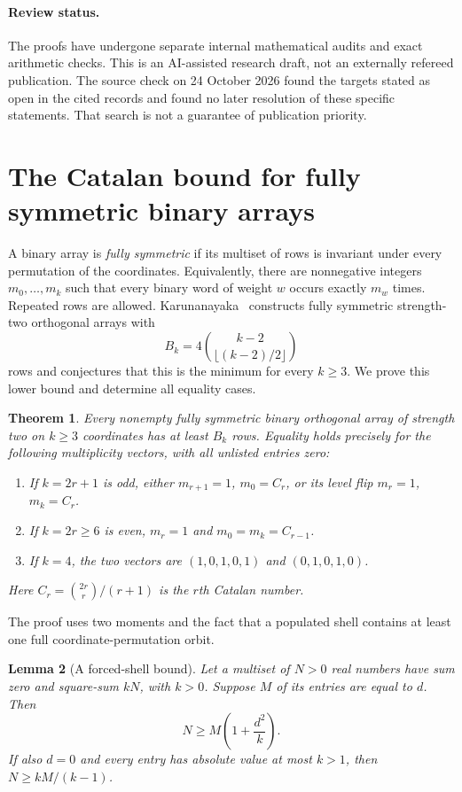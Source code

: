 \documentclass[11pt]{article}
\newtheorem{theorem}{Theorem}[section]
\newtheorem{lemma}[theorem]{Lemma}
\theoremstyle{remark}
\numberwithin{equation}{section}
\begin{document}
\paragraph{Review status.}
The proofs have undergone separate internal mathematical audits and exact
arithmetic checks. This is an AI-assisted research draft, not an externally
refereed publication. The source check on 24 October 2026 found the targets
stated as open in the cited records and found no later resolution of these
specific statements. That search is not a guarantee of publication priority.

\section{The Catalan bound for fully symmetric binary arrays}
\label{sec:catalan-bound}

A binary array is \emph{fully symmetric} if its multiset of rows is invariant
under every permutation of the coordinates.  Equivalently, there are
nonnegative integers $m_0,\ldots,m_k$ such that every binary word of weight
$w$ occurs exactly $m_w$ times.  Repeated rows are allowed.
Karunanayaka~\cite{Karunanayaka2026} constructs fully symmetric strength-two
orthogonal arrays with
\[
 B_k=4\binom{k-2}{\lfloor(k-2)/2\rfloor}
\]
rows and conjectures that this is the minimum for every $k\ge3$.
We prove this lower bound and determine all equality cases.

\begin{theorem}\label{thm:catalan-minimum}
Every nonempty fully symmetric binary orthogonal array of strength two on
$k\ge3$ coordinates has at least $B_k$ rows.  Equality holds precisely for
the following multiplicity vectors, with all unlisted entries zero:
\begin{enumerate}
\item If $k=2r+1$ is odd, either $m_{r+1}=1$, $m_0=C_r$, or its level flip
$m_r=1$, $m_k=C_r$.
\item If $k=2r\ge6$ is even, $m_r=1$ and $m_0=m_k=C_{r-1}$.
\item If $k=4$, the two vectors are $(1,0,1,0,1)$ and $(0,1,0,1,0)$.
\end{enumerate}
Here $C_r=\binom{2r}{r}/(r+1)$ is the $r$th Catalan number.
\end{theorem}

The proof uses two moments and the fact that a populated shell contains at
least one full coordinate-permutation orbit.

\begin{lemma}[A forced-shell bound]\label{lem:forced-shell}
Let a multiset of $N>0$ real numbers have sum zero and square-sum $kN$, with
$k>0$.  Suppose $M$ of its entries are equal to $d$.  Then
\[
 N\ge M\left(1+\frac{d^2}{k}\right).
\]
If also $d=0$ and every entry has absolute value at most $k>1$, then
$N\ge kM/(k-1)$.
\end{lemma}
\end{document}
